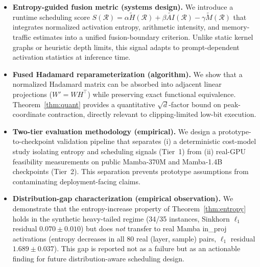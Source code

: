 \begin{itemize}

\item \textbf{Entropy-guided fusion metric (systems design).}
We introduce a runtime scheduling score
$S(\mathcal{R}) = \alpha\widetilde{H}(\mathcal{R})
  + \beta\widetilde{AI}(\mathcal{R})
  - \gamma\widetilde{M}(\mathcal{R})$
that integrates normalized activation entropy, arithmetic
intensity, and memory-traffic estimates into a unified
fusion-boundary criterion.
Unlike static kernel graphs or heuristic depth limits,
this signal adapts to prompt-dependent activation
statistics at inference time.

\item \textbf{Fused Hadamard reparameterization (algorithm).}
We show that a normalized Hadamard matrix can be absorbed
into adjacent linear projections ($W' = WH^\top$) while
preserving exact functional equivalence.
Theorem~\ref{thm:quant} provides a quantitative
$\sqrt{d}$-factor bound on peak-coordinate contraction,
directly relevant to clipping-limited low-bit execution.

\item \textbf{Two-tier evaluation methodology (empirical).}
We design a prototype-to-checkpoint validation pipeline
that separates (i) a deterministic cost-model study
isolating entropy and scheduling signals (Tier~1) from
(ii) real-GPU feasibility measurements on public
Mamba-370M and Mamba-1.4B checkpoints (Tier~2).
This separation prevents prototype assumptions from
contaminating deployment-facing claims.

\item \textbf{Distribution-gap characterization (empirical observation).}
We demonstrate that the entropy-increase property of
Theorem~\ref{thm:entropy} holds in the synthetic
heavy-tailed regime (34/35 instances, Sinkhorn $\ell_1$
residual $0.070\pm0.010$) but does \emph{not} transfer
to real Mamba in\_proj activations (entropy decreases
in all 80 real (layer, sample) pairs,
$\ell_1$ residual $1.689\pm0.037$).
This gap is reported not as a failure but as an
actionable finding for future distribution-aware
scheduling design.

\end{itemize}




